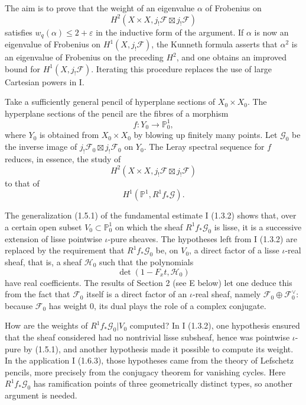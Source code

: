\documentclass[11pt]{article}
\theoremstyle{remark}
\begin{document}
The aim is to prove that the weight of an eigenvalue $\alpha$ of Frobenius on
\[
H^2(X\times X,j_!\mathcal F\boxtimes j_!\mathcal F)
\]
satisfies $w_q(\alpha)\le 2+\varepsilon$ in the inductive form of the argument. If $\alpha$ is now an eigenvalue of Frobenius on $H^1(X,j_!\mathcal F)$, the Kunneth formula asserts that $\alpha^2$ is an eigenvalue of Frobenius on the preceding $H^2$, and one obtains an improved bound for $H^1(X,j_!\mathcal F)$. Iterating this procedure replaces the use of large Cartesian powers in I.

Take a sufficiently general pencil of hyperplane sections of $X_0\times X_0$. The hyperplane sections of the pencil are the fibres of a morphism
\[
f:Y_0\longrightarrow \mathbb P^1_0,
\]
where $Y_0$ is obtained from $X_0\times X_0$ by blowing up finitely many points. Let $\mathcal G_0$ be the inverse image of $j_!\mathcal F_0\boxtimes j_!\mathcal F_0$ on $Y_0$. The Leray spectral sequence for $f$ reduces, in essence, the study of
\[
H^2(X\times X,j_!\mathcal F\boxtimes j_!\mathcal F)
\]
to that of
\[
H^1(\mathbb P^1,R^1 f_*\mathcal G).
\]

The generalization (1.5.1) of the fundamental estimate I (1.3.2) shows that, over a certain open subset $V_0\subset \mathbb P^1_0$ on which the sheaf $R^1f_*\mathcal G_0$ is lisse, it is a successive extension of lisse pointwise $\iota$-pure sheaves. The hypotheses left from I (1.3.2) are replaced by the requirement that $R^1f_*\mathcal G_0$ be, on $V_0$, a direct factor of a lisse $\iota$-real sheaf, that is, a sheaf $\mathcal H_0$ such that the polynomials
\[
\det(1-F_xt,\mathcal H_0)
\]
have real coefficients. The results of Section 2 (see E below) let one deduce this from the fact that $\mathcal F_0$ itself is a direct factor of an $\iota$-real sheaf, namely $\mathcal F_0\oplus\mathcal F_0^\vee$: because $\mathcal F_0$ has weight $0$, its dual plays the role of a complex conjugate.

How are the weights of $R^1f_*\mathcal G_0|V_0$ computed? In I (1.3.2), one hypothesis ensured that the sheaf considered had no nontrivial lisse subsheaf, hence was pointwise $\iota$-pure by (1.5.1), and another hypothesis made it possible to compute its weight. In the application I (1.6.3), those hypotheses came from the theory of Lefschetz pencils, more precisely from the conjugacy theorem for vanishing cycles. Here $R^1f_*\mathcal G_0$ has ramification points of three geometrically distinct types, so another argument is needed.
\end{document}
